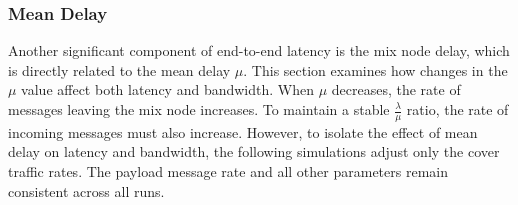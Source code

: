 \documentclass[a4paper,11pt,oneside]{report}
\begin{document}
\subsubsection{Mean Delay}
Another significant component of end-to-end latency is the mix node delay, which is directly related to the mean delay \(\mu\). This section examines how changes in the \(\mu\) value affect both latency and bandwidth. When \(\mu\) decreases, the rate of messages leaving the mix node increases. To maintain a stable \(\frac{\lambda}{\mu}\) ratio, the rate of incoming messages must also increase. However, to isolate the effect of mean delay on latency and bandwidth, the following simulations adjust only the cover traffic rates. The payload message rate and all other parameters remain consistent across all runs.


\end{document}
